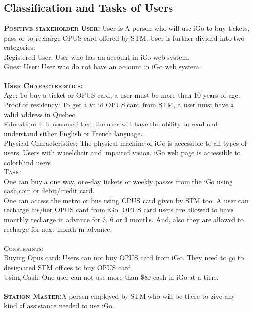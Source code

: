 \documentclass[a4paper, 11pt]{report}
\begin{document}
\subsection{Classification and Tasks of Users}
\textsc{\large \bf Positive stakeholder} \newline
\textsc{\large \bf User:} User is A person who will use iGo to buy tickets, pass or to recharge OPUS card offered by STM. User is further divided into two categories: \\
Registered User: User who has an account in iGo web system.\\
Guest User: User who do not have an account in iGo web system.\\\\
\textsc{\large \bf User Characteristics:}\\
 Age: To buy a ticket or OPUS card, a user must be more than 10 years of age.\\
Proof of residency: To get a valid OPUS card from STM, a user must have a valid address in Quebec.\\
Education: It is assumed that the user will have the ability to read and understand either English or French language.\\
Physical Characteristics: The physical machine of iGo is accessible to all types of users. Users with wheelchair and impaired vision. iGo web page is accessible to colorblind users\\
\textsc{\large  Task:}\\ One can buy a one way, one-day tickets or weekly passes from the iGo using cash,coin or debit/credit card.\\
One can access the metro or bus using OPUS card given by STM too. A user can recharge his/her OPUS card from iGo. OPUS card users are allowed to have monthly recharge in advance for 3, 6 or 9 months. And, also they are allowed to recharge for next month in advance. \\\\
\textsc{\large  Constraints:} \\
Buying Opus card: Users can not buy OPUS card from iGo. They need to go to designated STM offices to buy OPUS card.\\
Using Cash: One user can not use more than \$80 cash in iGo at a time.\\\\
\textsc{\large \bf Station Master:}A person employed by STM who will be there to give any kind of assistance needed to use iGo. \\
\end{document}
